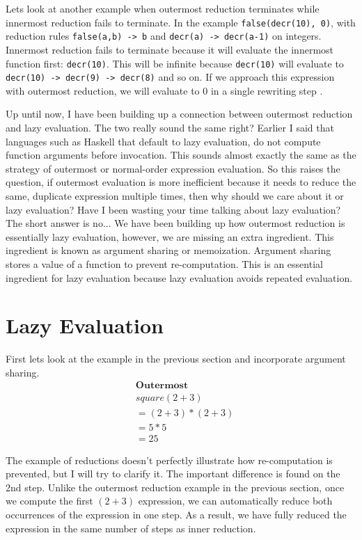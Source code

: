 \documentclass{article}
\begin{document}
\medskip\noindent
Lets look at another example when outermost reduction terminates while innermost reduction fails to terminate. In the example \texttt{false(decr(10), 0)}, with reduction rules \texttt{false(a,b) -> b} and \texttt{decr(a) -> decr(a-1)} on integers. Innermost reduction fails to terminate because it will evaluate the innermost function first: \texttt{decr(10)}. This will be infinite because \texttt{decr(10)} will evaluate to \texttt{decr(10) -> decr(9) -> decr(8)} and so on. If we approach this expression with outermost reduction, we will evaluate to 0 in a single rewriting step \cite{Gnaedig}.

\medskip\noindent
Up until now, I have been building up a connection between outermost reduction and lazy evaluation. The two really sound the same right? Earlier I said that languages such as Haskell that default to lazy evaluation, do not compute function arguments before invocation. This sounds almost exactly the same as the strategy of outermost or normal-order expression evaluation. So this raises the question, if outermost evaluation is more inefficient because it needs to reduce the same, duplicate expression multiple times, then why should we care about it or lazy evaluation? Have I been wasting your time talking about lazy evaluation? The short answer is no... We have been building up how outermost reduction is essentially lazy evaluation, however, we are missing an extra ingredient. This ingredient is known as argument sharing or memoization. Argument sharing stores a value of a function to prevent re-computation. This is an essential ingredient for lazy evaluation because lazy evaluation avoids repeated evaluation. 



\section{Lazy Evaluation}

First lets look at the example in the previous section and incorporate argument sharing. \noindent\begin{align*}
&\textbf{Outermost}  \\
&square (2+3)  \\
&=(2+3)*(2+3) \\
&=5 * 5   \\
&=25   
\end{align*}

\medskip\noindent
The example of reductions doesn't perfectly illustrate how re-computation is prevented, but I will try to clarify it. The important difference is found on the 2nd step. Unlike the outermost reduction example in the previous section, once we compute the first $(2+3)$ expression, we can automatically reduce both occurrences of the expression in one step. As a result, we have fully reduced the expression in the same number of steps as inner reduction.
\end{document}
